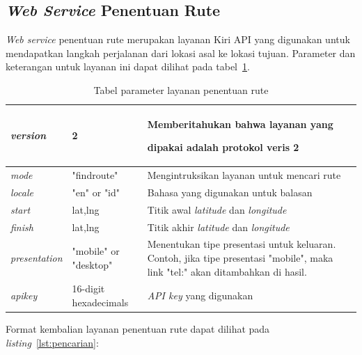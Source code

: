 \subsection{\textit{Web Service} Penentuan Rute}
\label{subsec:Web Service Penentuan Rute}
\hspace{0.5cm} \textit{Web service} penentuan rute merupakan layanan Kiri API yang digunakan untuk mendapatkan langkah perjalanan dari lokasi asal ke lokasi tujuan. Parameter dan keterangan untuk layanan ini dapat dilihat pada tabel~\ref{tab:routingWebService}.

\begin{table}[H]
	\centering
		\begin{tabular}{|p{2cm}|p{4cm}|p{8cm}|}
			\hline
			\textit{version} & 2 & Memberitahukan bahwa layanan yang \strut dipakai adalah protokol veris 2 \\ \hline
			\textit{mode} & "findroute" & Mengintruksikan layanan untuk mencari rute \\ \hline
			\textit{locale} & "en" or "id" & Bahasa yang digunakan untuk balasan \\ \hline
			\textit{start} & lat,lng & Titik awal \textit{latitude} dan \textit{longitude} \\ \hline
			\textit{finish} & lat,lng & Titik akhir \textit{latitude} dan \textit{longitude}  \\ \hline
			\textit{presentation} & "mobile" or "desktop" & Menentukan tipe presentasi untuk keluaran. Contoh, jika tipe presentasi "mobile", maka link "tel:" akan ditambahkan di hasil. \\ \hline
			\textit{apikey} & 16-digit hexadecimals & \textit{API key} yang digunakan \\ \hline
			\hline
		\end{tabular}
	\caption{Tabel parameter layanan penentuan rute}
	\label{tab:routingWebService}
\end{table}

Format kembalian layanan penentuan rute dapat dilihat pada \textit{listing}~\ref{lst:pencarian}:

